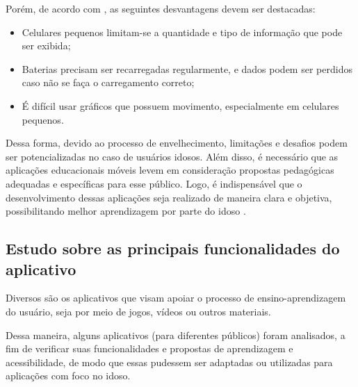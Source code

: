 Porém, de acordo com \cite{RICHAMEHTA2016}, as seguintes desvantagens devem ser destacadas: 

\begin{itemize}
    \item Celulares pequenos limitam-se a quantidade e tipo de informação que pode ser exibida;
    \item Baterias precisam ser recarregadas regularmente, e dados podem ser perdidos caso não se faça o carregamento correto;
    \item É difícil usar gráficos que possuem movimento, especialmente em celulares pequenos.
\end{itemize}

Dessa forma, devido ao processo de envelhecimento, limitações e desafios podem ser potencializadas no caso de usuários idosos. Além disso, é necessário que as aplicações educacionais móveis levem em consideração propostas pedagógicas adequadas e específicas para esse público. Logo, é indispensável que o desenvolvimento dessas aplicações seja realizado de maneira clara e objetiva, possibilitando melhor aprendizagem por parte do idoso \citep{giubilei1993pedagogia}.

\subsection{Estudo sobre as principais funcionalidades do aplicativo}
\label{sec:estudo_funcionalidades_apps}

Diversos são os aplicativos que visam apoiar o processo de ensino-aprendizagem do usuário, seja por meio de jogos, vídeos ou outros materiais. 

Dessa maneira, alguns aplicativos (para diferentes públicos) foram analisados, a fim de verificar suas funcionalidades e propostas de aprendizagem e acessibilidade, de modo que essas pudessem ser adaptadas ou utilizadas para aplicações com foco no idoso.

